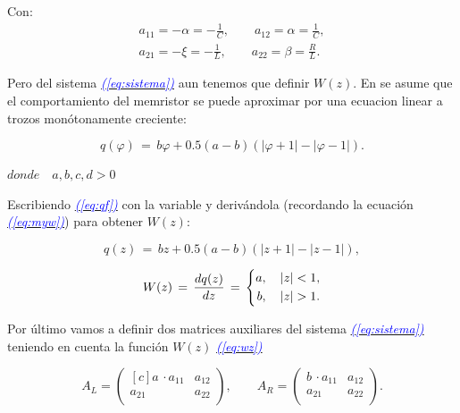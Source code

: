 \documentclass[12pt,a4paper]{report} %
\newcommand{\eref}[1]{\hyperref[#1]{\textcolor{blue}{\textit{(\ref*{#1})}}}}
\begin{document}
	Con:
	\begin{equation}
		\label{eq:amatriz}
	\begin{gathered}
		a_{11}=-\alpha=-\frac{1}{C}, \qquad a_{12}=\alpha=\frac{1}{C},\\[2mm]
		a_{21}=-\xi =-\frac{1}{L}, \qquad a_{22}=\beta = \frac{R}{L}.
	\end{gathered}
	\end{equation}\smallskip
	
	Pero del sistema \eref{eq:sistema} aun tenemos que definir $W(z)$. En \cite{chuaoscillator2008} se asume que el comportamiento del memristor se puede aproximar por una ecuacion linear a trozos monótonamente creciente:
	
	\begin{equation}
		q(\varphi)\,=\,b\varphi+0.5(a-b)(|\varphi+1|-|\varphi-1|).
		\label{eq:qf}
	\end{equation}
    \begin{center}
    	$ donde \quad a,b,c,d> 0$
    \end{center}
    
    Escribiendo \eref{eq:qf} con la variable  y derivándola (recordando la ecuación \eref{eq:myw}) para obtener $W(z)$:
    
    \begin{equation}
    	q(z)\,=\,bz+0.5(a-b)(|z+1|-|z-1|),
    	\label{eq:qfz}
    \end{equation}
    
    \begin{equation}
    	W(z)\,=\,\frac{dq(z)}{dz}\,=\,
    		\label{eq:wz}
    		\scalebox{1}{$\displaystyle
    			\left\{
    			\begin{aligned}
    				a, \quad   |z| < 1,\\
    				b, \quad   |z| > 1.
    			\end{aligned}
    			\right.
    			$}
    \end{equation}\smallskip
    
    Por último vamos a definir dos matrices auxiliares del sistema \eref{eq:sistema} teniendo en cuenta la función $W(z)$ \eref{eq:wz}
    
    \begin{equation}
    	A_L=\begin{pmatrix*}[c]
    		a \, \cdotp a_{11} & a_{12}\\
    	             a_{21} & a_{22}\\
    	\end{pmatrix*}, \qquad 	A_R=\begin{pmatrix*}
    	b \, \cdotp a_{11} & a_{12}\\
    	a_{21} & a_{22}\\
    	\end{pmatrix*}.
    \end{equation}\smallskip
    
\end{document}
